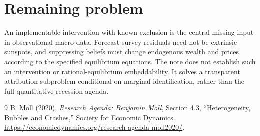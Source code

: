 \documentclass[11pt]{article}
\theoremstyle{definition}
\begin{document}
\section*{Remaining problem}
An implementable intervention with known exclusion is the central missing
input in observational macro data. Forecast-survey residuals need not be
extrinsic sunspots, and suppressing beliefs must change endogenous wealth
and prices according to the specified equilibrium equations. The note does
not establish such an intervention or rational-equilibrium embeddability.
It solves a transparent attribution subproblem conditional on marginal
identification, rather than the full quantitative recession agenda.

\begin{thebibliography}{9}
 B. Moll (2020), \emph{Research Agenda: Benjamin Moll},
Section 4.3, ``Heterogeneity, Bubbles and Crashes,'' Society for Economic Dynamics.
\url{https://economicdynamics.org/research-agenda-moll2020/}.
\end{thebibliography}
\end{document}
